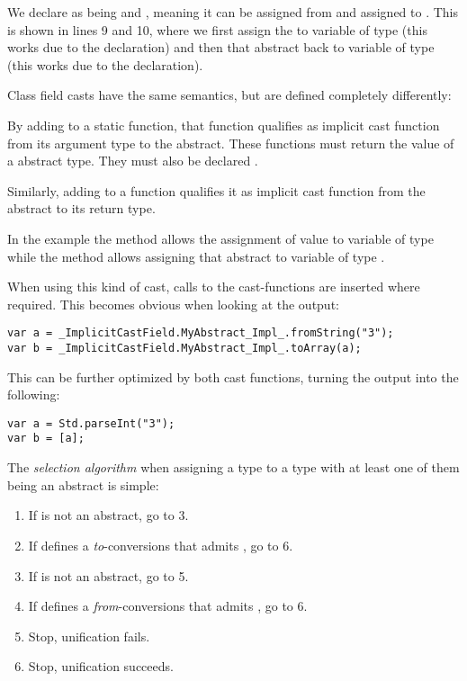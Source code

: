 We declare  as being  and , meaning it can be assigned from  and assigned to . This is shown in lines 9 and 10, where we first assign the   to variable  of type  (this works due to the  declaration) and then that abstract back to variable  of type  (this works due to the  declaration).

Class field casts have the same semantics, but are defined completely differently:

By adding  to a static function, that function qualifies as implicit cast function from its argument type to the abstract. These functions must return the value of a abstract type. They must also be declared .

Similarly, adding  to a function qualifies it as implicit cast function from the abstract to its return type.

In the example the method  allows the assignment of value  to variable  of type  while the method  allows assigning that abstract to variable  of type .

When using this kind of cast, calls to the cast-functions are inserted where required. This becomes obvious when looking at the  output:

\begin{lstlisting}
var a = _ImplicitCastField.MyAbstract_Impl_.fromString("3");
var b = _ImplicitCastField.MyAbstract_Impl_.toArray(a);
\end{lstlisting}
This can be further optimized by  both cast functions, turning the output into the following:

\begin{lstlisting}
var a = Std.parseInt("3");
var b = [a];
\end{lstlisting}
The \emph{selection algorithm} when assigning a type  to a type  with at least one of them being an abstract is simple:

\begin{enumerate}
	\item If  is not an abstract, go to 3.
	\item If  defines a \emph{to}-conversions that admits , go to 6.
	\item If  is not an abstract, go to 5.
	\item If  defines a \emph{from}-conversions that admits , go to 6.
	\item Stop, unification fails.
	\item Stop, unification succeeds.
\end{enumerate}

